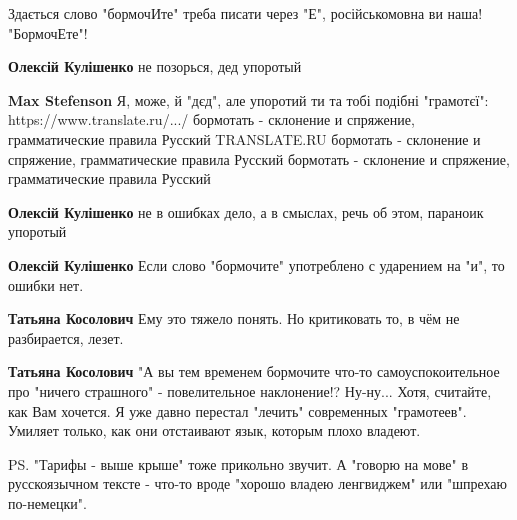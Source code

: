 \begin{itemize}
Здається слово "бормочИте" треба писати через "Е", російськомовна ви наша! "БормочЕте"!

\begin{itemize}

\textbf{Олексій Кулішенко} не позорься, дед упоротый


\textbf{Max Stefenson} Я, може, й "дєд", але упоротий ти та тобі подібні "грамотєї": https://www.translate.ru/.../%
бормотать - склонение и спряжение, грамматические правила Русский
TRANSLATE.RU
бормотать - склонение и спряжение, грамматические правила Русский
бормотать - склонение и спряжение, грамматические правила Русский


\textbf{Олексій Кулішенко} не в ошибках дело, а в смыслах, речь об этом, параноик упоротый


\textbf{Олексій Кулішенко} Если слово "бормочите" употреблено с ударением на "и", то ошибки нет.


\textbf{Татьяна Косолович} Ему это тяжело понять. Но критиковать то, в чём не разбирается, лезет.


\textbf{Татьяна Косолович} "А вы тем временем бормочите что-то самоуспокоительное про "ничего страшного" - повелительное наклонение!? Ну-ну... Хотя, считайте, как Вам хочется. Я уже давно перестал "лечить" современных "грамотеев". Умиляет только, как они отстаивают язык, которым плохо владеют.


PS. "Тарифы - выше крыше" тоже прикольно звучит. А "говорю на мове" в русскоязычном тексте - что-то вроде "хорошо владею ленгвиджем" или "шпрехаю по-немецки".
\end{itemize}


\end{itemize}
